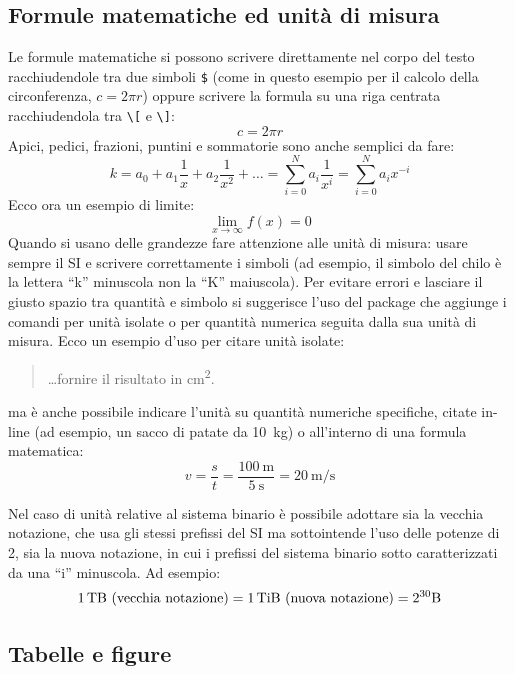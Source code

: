 
\subsection{Formule matematiche ed unità di misura}

Le formule matematiche si possono scrivere direttamente nel corpo del testo racchiudendole tra due simboli \verb+$+
(come in questo esempio per il calcolo della circonferenza, $c = 2 \pi r$)
oppure scrivere la formula su una riga centrata racchiudendola tra \verb+\[+ e \verb+\]+:
\[
c = 2 \pi r
\]
Apici, pedici, frazioni, puntini e sommatorie sono anche semplici da fare:
\[
k = a_0 + a_1 \frac{1}{x} + a_2 \frac{1}{x^2} + \dots = \sum_{i=0}^N a_i \frac{1}{x^i} = \sum_{i=0}^N a_i x^{-i}
\]
Ecco ora un esempio di limite:
\[
\lim_{x\to\infty}f(x)=0
\]
Quando si usano delle grandezze fare attenzione alle unità di misura: usare sempre il SI e scrivere correttamente i simboli (ad esempio, il simbolo del chilo è la lettera ``k'' minuscola non la ``K'' maiuscola).
Per evitare errori e lasciare il giusto spazio tra quantità e simbolo si suggerisce l'uso del package  che aggiunge i comandi  per unità isolate o  per quantità numerica seguita dalla sua unità di misura.
Ecco un esempio d'uso per citare unità isolate:
\begin{quote}
\ldots fornire il risultato in \si{\square\centi\metre}.
\end{quote}
ma è anche possibile indicare l'unità su quantità numeriche specifiche, citate in-line (ad esempio, un sacco di patate da \SI{10}{\kilo\gram}) o all'interno di una formula matematica:
\[
v = \frac{s}{t} = \frac{ \SI{100}{\meter} }{ \SI{5}{\second} } = \SI{20}{\meter\per\second}
\]

Nel caso di unità relative al sistema binario è possibile adottare sia la vecchia notazione, che usa gli stessi prefissi del SI ma sottointende l'uso delle potenze di 2, sia la nuova notazione, in cui i prefissi del sistema binario sotto caratterizzati da una ``i'' minuscola.
Ad esempio:
\[
\SI{1}{\tera\byte}\ \mbox{(vecchia notazione)} =
\SI{1}{\tebi\byte}\ \mbox{(nuova notazione)} =
2^{30} \si{\byte}
\]


\subsection{Tabelle e figure}

